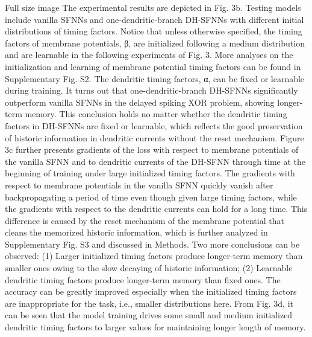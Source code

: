 Full size image
The experimental results are depicted in Fig. 3b. Testing models include vanilla SFNNs and one-dendritic-branch DH-SFNNs with different initial distributions of timing factors. Notice that unless otherwise specified, the timing factors of membrane potentials, β, are initialized following a medium distribution and are learnable in the following experiments of Fig. 3. More analyses on the initialization and learning of membrane potential timing factors can be found in Supplementary Fig. S2. The dendritic timing factors, α, can be fixed or learnable during training. It turns out that one-dendritic-branch DH-SFNNs significantly outperform vanilla SFNNs in the delayed spiking XOR problem, showing longer-term memory. This conclusion holds no matter whether the dendritic timing factors in DH-SFNNs are fixed or learnable, which reflects the good preservation of historic information in dendritic currents without the reset mechanism. Figure 3c further presents gradients of the loss with respect to membrane potentials of the vanilla SFNN and to dendritic currents of the DH-SFNN through time at the beginning of training under large initialized timing factors. The gradients with respect to membrane potentials in the vanilla SFNN quickly vanish after backpropagating a period of time even though given large timing factors, while the gradients with respect to the dendritic currents can hold for a long time. This difference is caused by the reset mechanism of the membrane potential that cleans the memorized historic information, which is further analyzed in Supplementary Fig. S3 and discussed in Methods. Two more conclusions can be observed: (1) Larger initialized timing factors produce longer-term memory than smaller ones owing to the slow decaying of historic information; (2) Learnable dendritic timing factors produce longer-term memory than fixed ones. The accuracy can be greatly improved especially when the initialized timing factors are inappropriate for the task, i.e., smaller distributions here. From Fig. 3d, it can be seen that the model training drives some small and medium initialized dendritic timing factors to larger values for maintaining longer length of memory.


